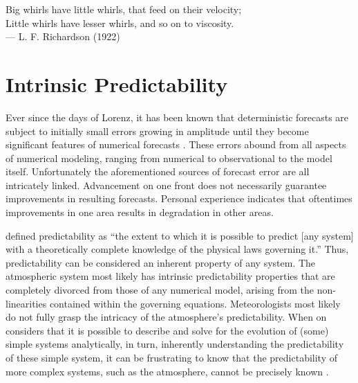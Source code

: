 

\begin{blockquote}
    \begin{center}
        Big whirls have little whirls, that feed on their velocity; \\
        Little whirls have lesser whirls, and so on to viscosity. \\
        --- L. F. Richardson (1922) \nocite{richardson1922weather}
    \end{center}
\end{blockquote}

\vspace{2.5em}




\section{Intrinsic Predictability}

Ever since the days of Lorenz, it has been known that deterministic forecasts are subject to initially small errors growing in amplitude until they become significant features of numerical forecasts \citep{lorenz1963predictability, lorenz1965predictability}. These errors abound from all aspects of numerical modeling, ranging from numerical to observational to the model itself. Unfortunately the aforementioned sources of forecast error are all intricately linked. Advancement on one front does not necessarily guarantee improvements in resulting forecasts. Personal experience indicates that oftentimes improvements in one area results in degradation in other areas.


\cite{thompson1957predictability} defined predictability as ``the extent to which it is possible to predict [any system] with a theoretically complete knowledge of the physical laws governing it.'' Thus, predictability can be considered an inherent property of any system. The atmospheric system most likely has intrinsic predictability properties that are completely divorced from those of any numerical model, arising from the non-linearities contained within the governing equations.  Meteorologists most likely do not fully grasp the intricacy of the atmosphere's predictability.  When on considers that it is possible to describe and solve for the evolution of (some) simple systems analytically, in turn, inherently understanding the predictability of these simple system, it can be frustrating to know that the predictability of more complex systems, such as the atmosphere, cannot be precisely known \citep{hacker2005predictability}.


